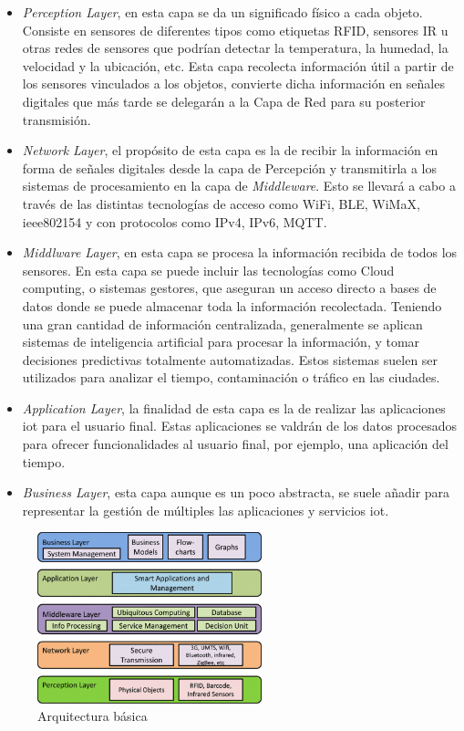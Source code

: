 \begin{itemize}
    \item \textit{Perception Layer}, en esta capa se da un significado físico a cada objeto. Consiste en sensores de diferentes tipos como etiquetas RFID, sensores IR u otras redes de sensores que podrían detectar la temperatura, la humedad, la velocidad y la ubicación, etc. Esta capa recolecta información útil a partir de los sensores vinculados a los objetos,  convierte dicha información en señales digitales que más tarde se delegarán a la Capa de Red para su posterior transmisión.
    
    \item \textit{Network Layer}, el propósito de esta capa es la de recibir la información en
    forma de señales digitales desde la capa de Percepción y transmitirla a los sistemas de procesamiento en la capa de \textit{Middleware}. Esto se llevará a cabo a través de las distintas tecnologías de acceso como WiFi, BLE, WiMaX, ieee802154 y con protocolos como IPv4, IPv6, MQTT.
    
    \item \textit{Middlware Layer}, en esta capa se procesa la información recibida de todos los sensores. En esta capa se puede incluir las tecnologías como Cloud computing, o sistemas gestores,  que aseguran un acceso directo a bases de datos donde se puede almacenar toda la información recolectada. Teniendo una gran cantidad de información centralizada, generalmente se aplican sistemas de inteligencia artificial para procesar la información, y tomar decisiones predictivas totalmente automatizadas. Estos sistemas suelen ser utilizados para analizar el tiempo, contaminación o tráfico en las ciudades. 
    
    \item \textit{Application Layer}, la finalidad de  esta  capa es la de realizar las aplicaciones \gls{iot} para el usuario final. Estas aplicaciones se valdrán de los datos procesados para ofrecer funcionalidades al usuario final, por ejemplo, una aplicación del tiempo.
    
    \item \textit{Business Layer}, esta capa aunque es un poco abstracta, se suele añadir para representar la gestión de múltiples las aplicaciones y servicios \gls{iot}. 
\end{itemize}

\begin{figure}[ht]
    \centering
    \includegraphics[width=6.5cm]{archivos/img/teoria/arch_edited.png}
    \caption{Arquitectura básica }
    \label{fig:iotBasicArch}
\end{figure}


